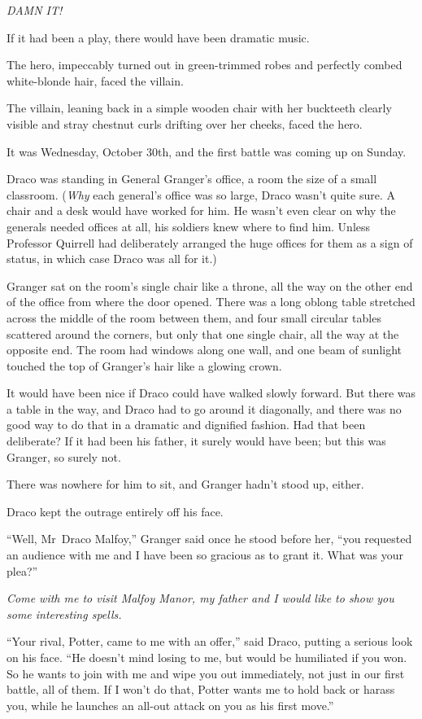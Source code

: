 \emph{DAMN IT!}

\later

If it had been a play, there would have been dramatic music.

The hero, impeccably turned out in green-trimmed robes and perfectly combed white-blonde hair, faced the villain.

The villain, leaning back in a simple wooden chair with her buckteeth clearly visible and stray chestnut curls drifting over her cheeks, faced the hero.

It was Wednesday, October 30th, and the first battle was coming up on Sunday.

Draco was standing in General Granger’s office, a room the size of a small classroom. (\emph{Why} each general’s office was so large, Draco wasn’t quite sure. A chair and a desk would have worked for him. He wasn’t even clear on why the generals needed offices at all, his soldiers knew where to find him. Unless Professor Quirrell had deliberately arranged the huge offices for them as a sign of status, in which case Draco was all for it.)

Granger sat on the room’s single chair like a throne, all the way on the other end of the office from where the door opened. There was a long oblong table stretched across the middle of the room between them, and four small circular tables scattered around the corners, but only that one single chair, all the way at the opposite end. The room had windows along one wall, and one beam of sunlight touched the top of Granger’s hair like a glowing crown.

It would have been nice if Draco could have walked slowly forward. But there was a table in the way, and Draco had to go around it diagonally, and there was no good way to do that in a dramatic and dignified fashion. Had that been deliberate? If it had been his father, it surely would have been; but this was Granger, so surely not.

There was nowhere for him to sit, and Granger hadn’t stood up, either.

Draco kept the outrage entirely off his face.

“Well, Mr~Draco Malfoy,” Granger said once he stood before her, “you requested an audience with me and I have been so gracious as to grant it. What was your plea?”

\emph{Come with me to visit Malfoy Manor, my father and I would like to show you some interesting spells.}

“Your rival, Potter, came to me with an offer,” said Draco, putting a serious look on his face. “He doesn’t mind losing to me, but would be humiliated if you won. So he wants to join with me and wipe you out immediately, not just in our first battle, all of them. If I won’t do that, Potter wants me to hold back or harass you, while he launches an all-out attack on you as his first move.”

